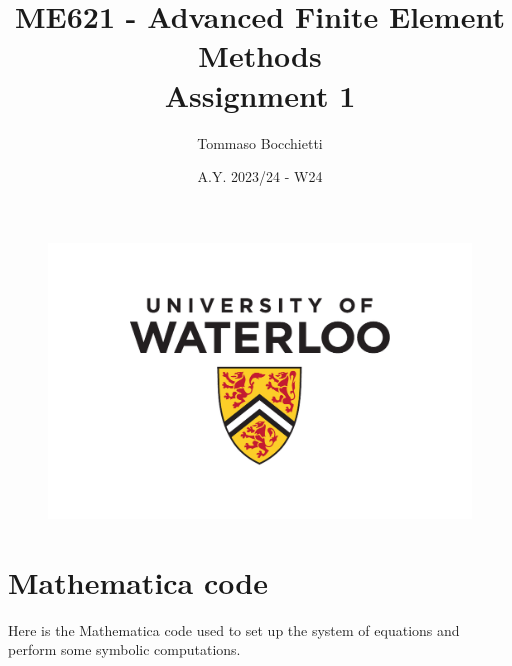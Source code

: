 \documentclass{../../commons/assignment}
\begin{document}
\graphicspath{{./img/}}


\title{ME621 - Advanced Finite Element Methods \\ Assignment 1}
\author{Tommaso Bocchietti}
\date{A.Y. 2023/24 - W24}

\maketitle

\begin{figure}[H]
    \centering
    \includegraphics[width=.9\textwidth]{./pdf/UniversityOfWaterloo_logo_vert_pms}
    \label{fig:University_Of_Waterloo_logo}
\end{figure}

\clearpage
\tableofcontents
\listoffigures
\listoftables
\pagebreak








\appendix
\section{Mathematica code}
\label{sec:appendix}

Here is the Mathematica code used to set up the system of equations and perform some symbolic computations.


\end{document}

